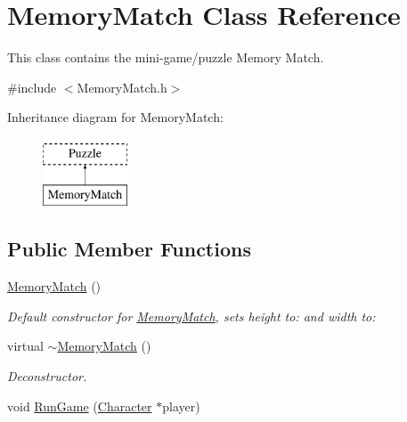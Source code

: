 \hypertarget{classMemoryMatch}{\section{Memory\-Match Class Reference}
\label{classMemoryMatch}
}


This class contains the mini-\/game/puzzle Memory Match.  




{\ttfamily \#include $<$Memory\-Match.\-h$>$}

Inheritance diagram for Memory\-Match\-:\begin{figure}[H]
\begin{center}
\leavevmode
\includegraphics[height=2.000000cm]{classMemoryMatch}
\end{center}
\end{figure}
\subsection*{Public Member Functions}
\begin{DoxyCompactItemize}
\item 
\hyperlink{classMemoryMatch_a7221a0b7d33bf079df51c1f7f52aa2dd}{Memory\-Match} ()
\begin{DoxyCompactList}\small\item\em Default constructor for \hyperlink{classMemoryMatch}{Memory\-Match}, sets height to\-: and width to\-: \end{DoxyCompactList}\item 
virtual \hyperlink{classMemoryMatch_a1b2cf5418b2b26e21b4fd12d880e79b7}{$\sim$\-Memory\-Match} ()
\begin{DoxyCompactList}\small\item\em Deconstructor. \end{DoxyCompactList}\item 
void \hyperlink{classMemoryMatch_a090950f764dee0b982ea254075d3667c}{Run\-Game} (\hyperlink{classCharacter}{Character} $\ast$player)
\end{DoxyCompactItemize}
